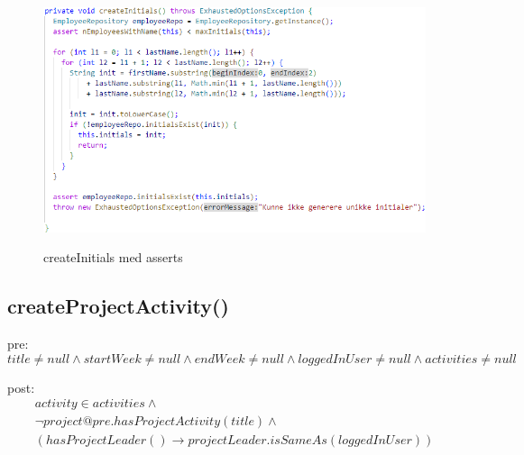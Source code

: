 \begin{figure}[H]
    \centering
    \caption{createInitials med asserts}
    \includegraphics[width = \textwidth, keepaspectratio]{ImplementationAndTest/Diagrams/contract_createInitials.png}
    \label{fig:contract_createInitials}
\end{figure}
\subsection{createProjectActivity()} \label{sec:contract_create_project_activity}
pre: 
\begin{equation}
    title \neq null \wedge startWeek \neq null \wedge endWeek \neq null \wedge loggedInUser \neq null \wedge activities \neq null
\end{equation}

post: 
\begin{equation}
\begin{gathered}
    activity \in activities \wedge \\
    \neg project@pre.hasProjectActivity(title) \wedge \\
    (hasProjectLeader() \to projectLeader.isSameAs(loggedInUser))
\end{gathered}
\end{equation}

